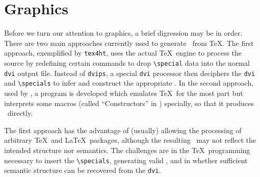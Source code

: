 \documentclass{llncs}
\begin{document}


\section{Graphics}\label{graphics}
Before we turn our attention to graphics,
a brief digression may be in order.
There are two main approaches currently used to generate
\HTML\ from \TeX. The first approach,
exemplified by \texttt{tex4ht}, uses the actual \TeX\ engine
to process the source by redefining certain commands to drop
\verb|\special| data into the normal \texttt{dvi} output file.
Instead of \texttt{dvips}, a special \texttt{dvi} processor then deciphers
the \texttt{dvi} and \verb|\specials|
to infer and construct the appropriate \HTML.
In the second approach, used by \LaTeXML, a program
is developed which emulates \TeX\ for the most part
but interprets some macros (called ``Constructors'' in \LaTeXML)
specially, so that it produces \XML\ directly.

The first approach has the advantage of (usually)
allowing the processing of arbitrary \TeX\ and \LaTeX\ packages,
although the resulting \HTML\ may not reflect the intended
structure nor semantics.
The challenges are in the \TeX\ programming necessary to
insert the \verb|\specials|, generating valid \HTML,
and in whether sufficient semantic structure can be
recovered from the \texttt{dvi}.
\end{document}
